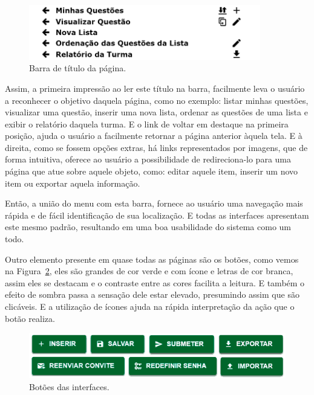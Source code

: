 \documentclass[
	12pt,				%
	openany,
	oneside,
	a4paper,			%
	english,			%
	brazil				%
	]{abntex2}
\begin{document}
\begin{figure}[H]
  \centering
  \includegraphics[width=0.9\textwidth]{prints/toolbar.png}
  \caption{Barra de título da página.}
  \label{print:toolbar}
  \vspace{-0.5cm}
\end{figure}

  Assim, a primeira impressão ao ler este título na barra, facilmente leva o usuário a reconhecer o objetivo daquela página, como no exemplo: listar minhas questões, visualizar uma questão, inserir uma nova lista, ordenar as questões de uma lista e exibir o relatório daquela turma. E o link de voltar em destaque na primeira posição, ajuda o usuário a facilmente retornar a página anterior àquela tela. E à direita, como se fossem opções extras, há links representados por imagens, que de forma intuitiva, oferece ao usuário a possibilidade de redireciona-lo para uma página que atue sobre aquele objeto, como: editar aquele item, inserir um novo item ou exportar aquela informação. 
  
  Então, a união do menu com esta barra, fornece ao usuário uma navegação mais rápida e de fácil identificação de sua localização. E todas as interfaces apresentam este mesmo padrão, resultando em uma boa usabilidade do sistema como um todo.
  
  Outro elemento presente em quase todas as páginas são os botões, como vemos na Figura~\ref{print:botoes}, eles são grandes de cor verde e com ícone e letras de cor branca, assim eles se destacam e o contraste entre as cores facilita a leitura. E também o efeito de sombra passa a sensação dele estar elevado, presumindo assim que são clicáveis. E a utilização de ícones ajuda na rápida interpretação da ação que o botão realiza. 
  
\begin{figure}[H]
  \centering
  \includegraphics[width=\textwidth]{prints/botoes.png}
  \caption{Botões das interfaces.}
  \label{print:botoes}
  \vspace{-0.5cm}
\end{figure}
\end{document}
